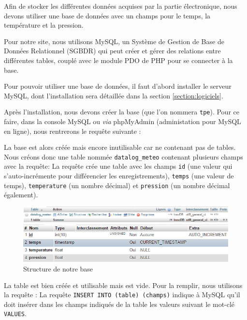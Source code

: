 Afin de stocker les différentes données acquises par la partie électronique, nous devons utiliser une base de données avec un champs pour le temps, la température et la pression.

\Espace

Pour notre site, nous utilisons MySQL, un Système de Gestion de Base de Données Relationnel (SGBDR) qui peut créer et gérer des relations entre différentes tables, couplé avec le module PDO de PHP pour se connecter à la base.

Pour pouvoir utiliser une base de données, il faut d'abord installer le serveur MySQL, dont l'installation sera détaillée dans la section \ref{section:logiciels}.

Après l'installation, nous devons créer la base (que l'on nommera \verb-tpe-). Pour ce faire, dans la console MySQL ou \emph{via} phpMyAdmin (administation pour MySQL en ligne), nous rentrerons le requête suivante :

La base est alors créée mais encore inutilisable car ne contenant pas de tables. Nous créons donc une table nommée \verb-datalog_meteo- contenant plusieurs champs avec la requête:
La requête crée une table avec les champs \verb-id- (une valeur qui s'auto-incrémente pour différencier les enregistrements), \verb-temps- (une valeur de temps), \verb-temperature- (un nombre décimal) et \verb-pression- (un nombre décimal également). 

\begin{figure}[!h]
	\centering
	\includegraphics[width=.8\linewidth]{Images/BDD}
	
	\vspace{5mm}
	
	\includegraphics[width=.8\linewidth]{Images/Structure_BDD}
	\caption{Structure de notre base}
\end{figure}

La table est bien créée et utilisable mais est vide. Pour la remplir, nous utilisons la requête :
La requête \verb-INSERT INTO (table) (champs)- indique à MySQL qu'il doit insérer dans les champs indiqués de la table les valeurs suivant le mot-clé \verb-VALUES-.

